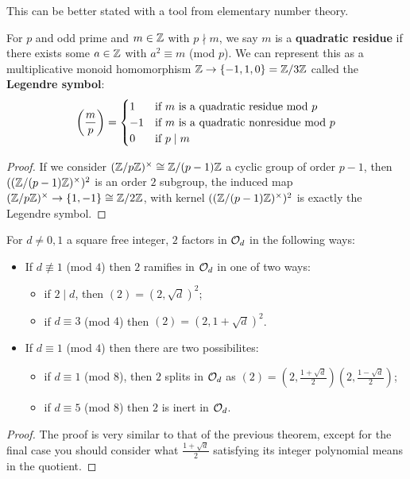 \documentclass{article}
\begin{document}
This can be better stated with a tool from elementary number theory.

\begin{definition}
    For $p$ and odd prime and $m\in\mathbb{Z}$ with $p\nmid m$, we say $m$ is a \textbf{quadratic residue} if there exists some $a\in\mathbb{Z}$ with $a^2\equiv m$ (mod $p$). We can represent this as a multiplicative monoid homomorphism $\mathbb{Z}\rightarrow \{-1,1,0\}=\mathbb{Z}/3\mathbb{Z}$ called the \textbf{Legendre symbol}: \[
    \left( \frac{m}{p} \right) = \begin{cases}
        1 & \text{if $m$ is a quadratic residue mod $p$} \\
        -1 & \text{if $m$ is a quadratic nonresidue mod $p$} \\
        0 & \text{if $p\mid m$}
    \end{cases}
    \]\begin{proof}
        If we consider $(\mathbb{Z}/p\mathbb{Z})^\times\cong \mathbb{Z}/(p-1)\mathbb{Z}$ a cyclic group of order $p-1$, then $((\mathbb{Z}/(p-1)\mathbb{Z})^\times)^2$ is an order $2$ subgroup, the induced map $(\mathbb{Z}/p\mathbb{Z})^\times \rightarrow \{1,-1\}\cong \mathbb{Z}/2\mathbb{Z}$, with kernel $((\mathbb{Z}/(p-1)\mathbb{Z})^\times)^2$ is exactly the Legendre symbol.
    \end{proof}
\end{definition}

\begin{theorem}
    For $d\neq 0,1$ a square free integer, $2$ factors in $\mathcal{O}_d$ in the following ways:\begin{itemize}
        \item If $d\not\equiv 1$ (mod $4$) then $2$ ramifies in $\mathcal{O}_d$ in one of two ways: \begin{itemize}
            \item if $2\mid d$, then $(2)=(2,\sqrt{d})^2$;
            \item if $d\equiv 3$ (mod $4$) then $(2)=(2,1+\sqrt{d})^2$.
        \end{itemize}
        \item If $d\equiv 1$ (mod $4$) then there are two possibilites: \begin{itemize}
            \item if $d\equiv 1$ (mod $8$), then $2$ splits in $\mathcal{O}_d$ as $(2)=(2,\frac{1+\sqrt{d}}{2})(2,\frac{1-\sqrt{d}}{2})$;
            \item if $d\equiv 5$ (mod $8$) then $2$ is inert in $\mathcal{O}_d$.
        \end{itemize}
    \end{itemize}
    \begin{proof}
        The proof is very similar to that of the previous theorem, except for the final case you should consider what $\frac{1+\sqrt{d}}{2}$ satisfying its integer polynomial means in the quotient.
    \end{proof}
\end{theorem}
\end{document}
